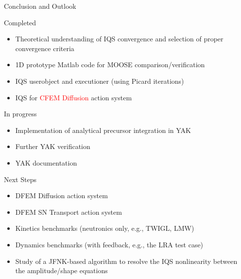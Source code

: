 \documentclass[8pt]{beamer}
\newcommand{\bi}{\begin{itemize}}
\newcommand{\ei}{\end{itemize}}
\newcommand{\tcr}[1]{\textcolor{red}{#1}}
\begin{document}
\begin{frame}{Conclusion and Outlook}

\begin{block}{Completed}
\bi
\item Theoretical understanding of IQS convergence and selection of proper convergence criteria
\item 1D prototype Matlab code for MOOSE comparison/verification
\item IQS userobject and executioner (using Picard iterations)
\item IQS for \tcr{CFEM Diffusion} action system
\ei
\end{block}

\begin{block}{In progress}
\bi
\item Implementation of analytical precursor integration in YAK
\item Further YAK verification
\item YAK documentation
\ei
\end{block}
\begin{block}{Next Steps}
\bi
\item DFEM Diffusion action system
\item DFEM SN Transport action system
\item Kinetics benchmarks (neutronics only, e.g., TWIGL, LMW)
\item Dynamics benchmarks (with feedback, e.g., the LRA test case)
\item Study of a JFNK-based algorithm to resolve the IQS nonlinearity between the amplitude/shape equations
\ei
\end{block}

\end{frame}

%
%
%

%
%

\end{document}
